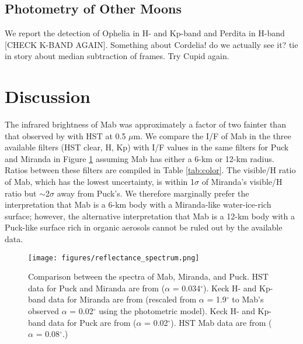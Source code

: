 \documentclass[preprint]{aastex631}
\begin{document}
\subsection{Photometry of Other Moons}

We report the detection of Ophelia in H- and Kp-band and Perdita in H-band [CHECK K-BAND AGAIN].
Something about Cordelia! do we actually see it?
tie in story about median subtraction of frames.
Try Cupid again.

\section{Discussion}
\label{s:discussion}

The infrared brightness of Mab was approximately a factor of two fainter than that observed by \citet{showalter06} with HST at 0.5 $\mu$m. We compare the I/F of Mab in the three available filters (HST clear, H, Kp) with I/F values in the same filters for Puck and Miranda \citep{karkoschka01, gibbard05, paradis23} in Figure \ref{fig:spectrum} assuming Mab has either a 6-km or 12-km radius. Ratios between these filters are compiled in Table \ref{tab:color}. The visible/H ratio of Mab, which has the lowest uncertainty, is within 1$\sigma$ of Miranda's visible/H ratio but $\sim$2$\sigma$ away from Puck's. We therefore marginally prefer the interpretation that Mab is a 6-km body with a Miranda-like water-ice-rich surface; however, the alternative interpretation that Mab is a 12-km body with a Puck-like surface rich in organic aerosols cannot be ruled out by the available data.



\begin{figure}
\texttt{[image: figures/reflectance\_spectrum.png]}
\caption{Comparison between the spectra of Mab, Miranda, and Puck. HST data for Puck and Miranda are from \citet{karkoschka01} ($\alpha$ = 0.034$^\circ$). Keck H- and Kp-band data for Miranda are from \citet{gibbard05} (rescaled from $\alpha$ = 1.9$^\circ$ to Mab's observed $\alpha$ = 0.02$^\circ$ using the \citet{karkoschka01} photometric model). Keck H- and Kp-band data for Puck are from \citet{paradis23} ($\alpha$ = 0.02$^\circ$). HST Mab data are from \citet{showalter06} ($\alpha$ = 0.08$^\circ$.)}
\label{fig:spectrum}
\end{figure}
\end{document}
